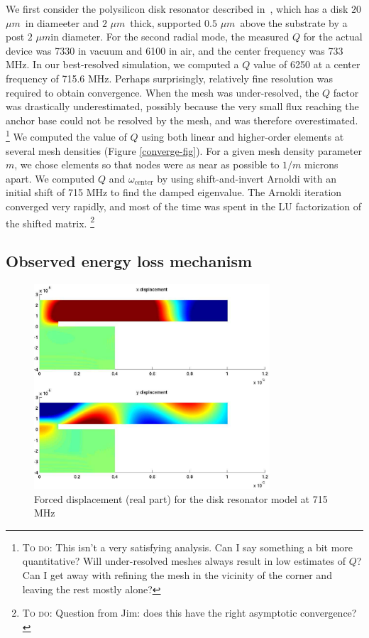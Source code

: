 \documentclass{article}
\newcommand{\um}{\ensuremath{\mu m}}
\newcommand{\note}[1]{\footnote{\textsc{To do}: #1}}
\begin{document}
We first consider the polysilicon disk resonator described
in~\cite{Wang:2003:SAG}, which has a disk $20$ \um\ in diameeter
and $2$ \um\ thick, supported $0.5$ \um\ above the substrate
by a post $2$ \um in diameter.
For the second radial mode, the measured $Q$ for the actual device was
7330 in vacuum and 6100 in air, and the center frequency was 733 MHz.
In our best-resolved simulation, we computed a $Q$ value of 6250 at a
center frequency of 715.6 MHz.  Perhaps surprisingly, relatively fine
resolution was required to obtain convergence.  When the mesh was
under-resolved, the $Q$ factor was drastically underestimated,
possibly because the very small flux reaching the anchor base could
not be resolved by the mesh, and was therefore overestimated.
\note{This isn't a very satisfying analysis.  Can I say something a bit
  more quantitative?  Will under-resolved meshes always result in low
  estimates of $Q$?  Can I get away with refining the mesh in the
  vicinity of the corner and leaving the rest mostly alone?}  
We computed the value of $Q$ using both linear and higher-order
elements at several mesh densities (Figure \ref{converge-fig}).  For a
given mesh density parameter $m$, we chose elements so that nodes were
as near as possible to $1/m$ microns apart.  We computed $Q$ and
$\omega_\mathrm{center}$ by using shift-and-invert Arnoldi with an
initial shift of 715 MHz to find the damped eigenvalue.  The Arnoldi
iteration converged very rapidly, and most of the time was spent in
the LU factorization of the shifted matrix.
\note{Question from Jim: does this have the right asymptotic convergence?}

\subsection{Observed energy loss mechanism}


\begin{figure}
\begin{center}
\includegraphics[height=3in]{drive715.pdf}
\end{center}
\caption{Forced displacement (real part) for the disk resonator
         model at 715 MHz}
\label{forced-mode-fig}
\end{figure}
\end{document}
